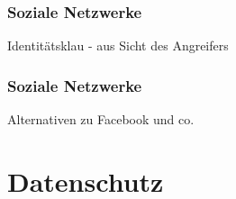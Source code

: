\documentclass[12pt]{beamer}
\begin{document}
\begin{frame}
  \frametitle{Soziale Netzwerke}

  \begin{center} \Large
    Identitätsklau - aus Sicht des Angreifers
  \end{center}
\end{frame}

\begin{frame}
  \frametitle{Soziale Netzwerke}

  \begin{center} \Large
   Alternativen zu Facebook und co. 
  \end{center}
\end{frame}

\section{Datenschutz}
\end{document}
